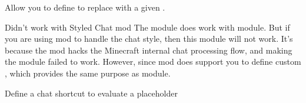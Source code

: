 \label{ch:chat_replace}
Allow you to define  to replace  with a given .

\begin{warn}{Didn't work with Styled Chat mod}
    The  module does work with  module.
    But if you are using  mod to handle the chat style, then this module will not work.
    It's because the  mod hacks the Minecraft internal chat processing flow, and making the  module failed to work.
    However, since  mod does support you to define custom , which provides the same purpose as  module.
\end{warn}

\begin{example}{Define a chat shortcut to evaluate a placeholder}
\end{example}